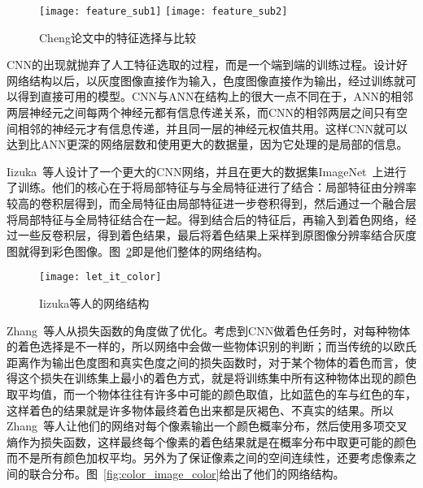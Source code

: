   \begin{figure}[h]
    \centering
      {\texttt{[image: feature\_sub1]}}
    \hspace{4em}
        {\texttt{[image: feature\_sub2]}}
    \caption{Cheng论文中的特征选择与比较}
    \label{fig:feature_choose}
  \end{figure}


  CNN的出现就抛弃了人工特征选取的过程，而是一个端到端的训练过程。设计好网络结构以后，以灰度图像直接作为输入，色度图像直接作为输出，经过训练就可以得到直接可用的模型。CNN与ANN在结构上的很大一点不同在于，ANN的相邻两层神经元之间每两个神经元都有信息传递关系，而CNN的相邻两层之间只有空间相邻的神经元才有信息传递，并且同一层的神经元权值共用。这样CNN就可以达到比ANN更深的网络层数和使用更大的数据量，因为它处理的是局部的信息。

  Iizuka~\cite{IizukaSIGGRAPH2016}等人设计了一个更大的CNN网络，并且在更大的数据集ImageNet~\cite{DBLP:journals/ijcv/RussakovskyDSKS15}上进行了训练。他们的核心在于将局部特征与与全局特征进行了结合：局部特征由分辨率较高的卷积层得到，而全局特征由局部特征进一步卷积得到，然后通过一个融合层将局部特征与全局特征结合在一起。得到结合后的特征后，再输入到着色网络，经过一些反卷积层，得到着色结果，最后将着色结果上采样到原图像分辨率结合灰度图就得到彩色图像。图~\ref{fig:let_it_color}即是他们整体的网络结构。

  \begin{figure}[H]
    \centering
    \texttt{[image: let\_it\_color]}
    \caption{Iizuka等人的网络结构}
    \label{fig:let_it_color}
  \end{figure}

  Zhang~\cite{zhang2016colorful}等人从损失函数的角度做了优化。考虑到CNN做着色任务时，对每种物体的着色选择是不一样的，所以网络中会做一些物体识别的判断；而当传统的以欧氏距离作为输出色度图和真实色度之间的损失函数时，对于某个物体的着色而言，使得这个损失在训练集上最小的着色方式，就是将训练集中所有这种物体出现的颜色取平均值，而一个物体往往有许多中可能的颜色取值，比如蓝色的车与红色的车，这样着色的结果就是许多物体最终着色出来都是灰褐色、不真实的结果。所以Zhang~\cite{zhang2016colorful}等人让他们的网络对每个像素输出一个颜色概率分布，然后使用多项交叉熵作为损失函数，这样最终每个像素的着色结果就是在概率分布中取更可能的颜色而不是所有颜色加权平均。另外为了保证像素之间的空间连续性，还要考虑像素之间的联合分布。图~\ref{fig:color_image_color}给出了他们的网络结构。

